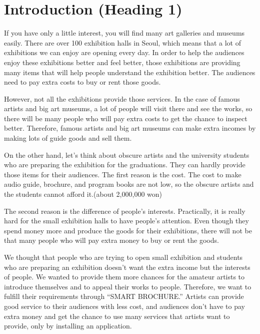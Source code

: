 \documentclass{article}
\begin{document}
\textbf{}


\section{  Introduction (Heading 1)}

\noindent 

If you have only a little interest, you will find many art galleries and museums easily. There are over 100 exhibition halls in Seoul, which means that a lot of exhibitions we can enjoy are opening every day. In order to help the audiences enjoy these exhibitions better and feel better, those exhibitions are providing many items that will help people understand the exhibition better. The audiences need to pay extra costs to buy or rent those goods.

\noindent 

However, not all the exhibitions provide those services. In the case of famous artists and big art museums, a lot of people will visit there and see the works, so there will be many people who will pay extra costs to get the chance to inspect better. Therefore, famous artists and big art museums can make extra incomes by making lots of guide goods and sell them.

\noindent On the other hand, let's think about obscure artists and the university students who are preparing the exhibition for the graduations. They can hardly provide those items for their audiences. The first reason is the cost. The cost to make audio guide, brochure, and program books are not low, so the obscure artists and the students cannot afford it.(about 2,000,000 won)

\noindent 

 The second reason is the difference of people's interests. Practically, it is really hard for the small exhibition halls to have people's attention. Even though they spend money more and produce the goods for their exhibitions, there will not be that many people who will pay extra money to buy or rent the goods.

\noindent 

 We thought that people who are trying to open small exhibition and students who are preparing an exhibition doesn't want the extra income but the interests of people. We wanted to provide them more chances for the amateur artists to introduce themselves and to appeal their works to people. Therefore, we want to fulfill their requirements through ``SMART BROCHURE.'' Artists can provide good service to their audiences with less cost, and audiences don't have to pay extra money and get the chance to use many services that artists want to provide, only by installing an application. 
\end{document}
